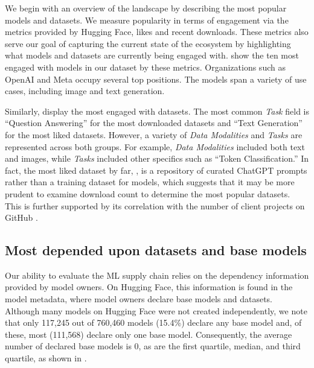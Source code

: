 

We begin with an overview of the landscape by describing the most popular models and datasets. We measure popularity in terms of engagement via the metrics provided by Hugging Face, likes and recent downloads. These metrics also serve our goal of capturing the current state of the ecosystem by highlighting what models and datasets are currently being engaged with. %
 show the ten most engaged with models in our dataset by these metrics. Organizations such as OpenAI and Meta occupy several top positions. The models span a variety of use cases, including image and text generation.

Similarly,  display the most engaged with datasets. The most common \emph{Task} field is ``Question Answering'' for the most downloaded datasets  and ``Text Generation'' for the most liked datasets. However, a variety of \emph{Data Modalities} and \emph{Tasks} are represented across both groups. For example, \emph{Data Modalities} included both text and images, while \emph{Tasks} included other specifics such as ``Token Classification.'' In fact, the most liked dataset by far, ,
is a repository of curated ChatGPT prompts rather than a training dataset for models, which suggests that it may be more prudent to examine download count to determine the most popular datasets. This is further supported by its correlation with the number of client projects on GitHub \cite{pepe2024hugging}.%


\subsection{Most depended upon datasets and base models}
\label{sec:most-dependend-upon}



Our ability to evaluate the ML supply chain relies on the dependency information provided by model owners.  On Hugging Face, this information is found in the model metadata, where model owners declare base models and datasets. Although many models on Hugging Face were not created independently, we note that only 117,245 out of 760,460  models (15.4\%) declare any base model and, of these, most (111,568) declare only one base model. Consequently, the average number of declared base models is 0, as are the first quartile, median, and third quartile, as shown in .

